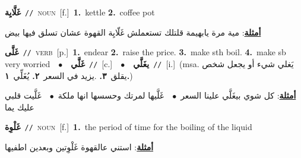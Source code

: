 \documentclass[10pt,a4paper,twoside]{article} %
\begin{document}
\begin{multicols}{2}
{\setlength\topsep{0pt}\textbf{\foreignlanguage{arabic}{غَلَّايِة}}\ {\color{gray}\texttt{//}\color{black}}\ \textsc{noun}\ [f.]\ \textbf{1.}~kettle  \textbf{2.}~coffee pot\  \begin{flushright}\color{gray}\foreignlanguage{arabic}{\textbf{\underline{\foreignlanguage{arabic}{أمثلة}}}: مية مرة يابهيمة قلتلك تستعملش غَلّايِة القهوة عشان تسلق فيها بيض}\end{flushright}\color{black}} \vspace{2mm}

{\setlength\topsep{0pt}\textbf{\foreignlanguage{arabic}{غَلَّى}}\ {\color{gray}\texttt{//}\color{black}}\ \textsc{verb}\ [p.]\ \textbf{1.}~endear  \textbf{2.}~raise the price.  \textbf{3.}~make sth boil.  \textbf{4.}~make sb very worried\ \ $\bullet$\ \ \setlength\topsep{0pt}\textbf{\foreignlanguage{arabic}{غَلَّي}}\ {\color{gray}\texttt{//}\color{black}}\ [c.]\ \ $\bullet$\ \ \setlength\topsep{0pt}\textbf{\foreignlanguage{arabic}{يغَلَّي}}\ {\color{gray}\texttt{//}\color{black}}\ [i.]\ \color{gray}(msa. \foreignlanguage{arabic}{يَغلي شيء أو يجعل شخص يقلق}~\foreignlanguage{arabic}{\textbf{٣.}}  .\foreignlanguage{arabic}{يزيد في السعر}~\foreignlanguage{arabic}{\textbf{٢.}}  \foreignlanguage{arabic}{يُغَلِّي}~\foreignlanguage{arabic}{\textbf{١.}})\color{black}\  \begin{flushright}\color{gray}\foreignlanguage{arabic}{\textbf{\underline{\foreignlanguage{arabic}{أمثلة}}}: كل شوي بيغَلَّي علينا السعر\ $\bullet$\ \  غَلَّيها لمرتك وحسسها انها ملكة\ $\bullet$\ \  غَلَّيت قلبي عليك يما}\end{flushright}\color{black}} \vspace{2mm}

{\setlength\topsep{0pt}\textbf{\foreignlanguage{arabic}{غَلْوِة}}\ {\color{gray}\texttt{//}\color{black}}\ \textsc{noun}\ [f.]\ \textbf{1.}~the period of time for the boiling of the liquid\  \begin{flushright}\color{gray}\foreignlanguage{arabic}{\textbf{\underline{\foreignlanguage{arabic}{أمثلة}}}: استني عالقهوة غَلْوِتين وبعدين اطفيها}\end{flushright}\color{black}} \vspace{2mm}


\end{multicols}
\end{document}
